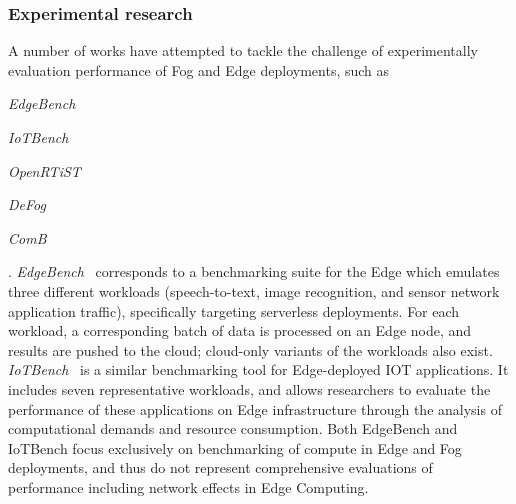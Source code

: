 \subsubsection{Experimental research}



A number of works have attempted to tackle the challenge of experimentally evaluation performance of Fog and Edge deployments, such as 
\begin{inlineenum}
    \item \emph{EdgeBench}~\cite{das2018edgebench}
    \item \emph{IoTBench}~\cite{lee2019iotbench}
    \item \emph{OpenRTiST}~\cite{george2020openrtist}
    \item \emph{DeFog}~\cite{mcchesney2019defog}
    \item \emph{ComB}~\cite{baurle2022comb}
\end{inlineenum}.
\emph{EdgeBench}~\cite{das2018edgebench} corresponds to a benchmarking suite for the Edge which emulates three different workloads (speech-to-text, image recognition, and sensor network application traffic), specifically targeting serverless deployments.
For each workload, a corresponding batch of data is processed on an Edge node, and results are pushed to the cloud;
cloud-only variants of the workloads also exist.
\emph{IoTBench}~\cite{lee2019iotbench} is a similar benchmarking tool for Edge-deployed \gls{IOT} applications.
It includes seven representative workloads, and allows researchers to evaluate the performance of these applications on Edge infrastructure through the analysis of computational demands and resource consumption.
Both EdgeBench and IoTBench focus exclusively on benchmarking of compute in Edge and Fog deployments, and thus do not represent comprehensive evaluations of performance including network effects in Edge Computing.

